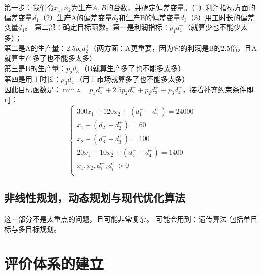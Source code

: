 \documentclass[11pt,a4paper]{article}
\begin{document}
\noindent 第一步：我们令$x_1,x_2$为生产$A,B$的台数，并确定偏差变量。（1）利润指标方面的偏差变量$d_1$（2）生产A的偏差变量$d_2$和生产B的偏差变量$d_3$（3）用工时长的偏差变量$d_4$。
第二部：确定目标函数。第一是利润指标：$p_1d_1^-$（就算少也不能少太多）；\\
第二是A的生产量：$2.5p_2d_2^+$（两方面：A更重要，因为它的利润是B的2.5倍，且A就算生产多了也不能多太多）\\
第三是B的生产量：$p_2d_3^+$（B就算生产多了也不能多太多）\\
第四是用工时长：$p_3d_4^+$（用工市场就算多了也不能多太多）\\
因此目标函数是：$\min z= p_1d_1^-+2.5p_2d_2^++p_2d_3^++p_3d_4^+$，接着补齐约束条件即可：
\begin{equation*}
	\begin{cases}
	300x_1+120x_2+(d_1^- - d_1^+)=24000\\
	x_1+(d_2^- - d_2^+)=60\\
	x_2+(d_3^- - d_3^+)=100\\
	20x_1+10x_2+(d_4^- - d_4^+)=1400\\
	x_1,x_2,d_i^-,d_i^+>0\\
	\end{cases}
\end{equation*}
\subsection{非线性规划，动态规划与现代优化算法}
这一部分不是太重点的问题，且可能非常复杂。
可能会用到：遗传算法
包括单目标与多目标规划。
\section{评价体系的建立}
\end{document}
